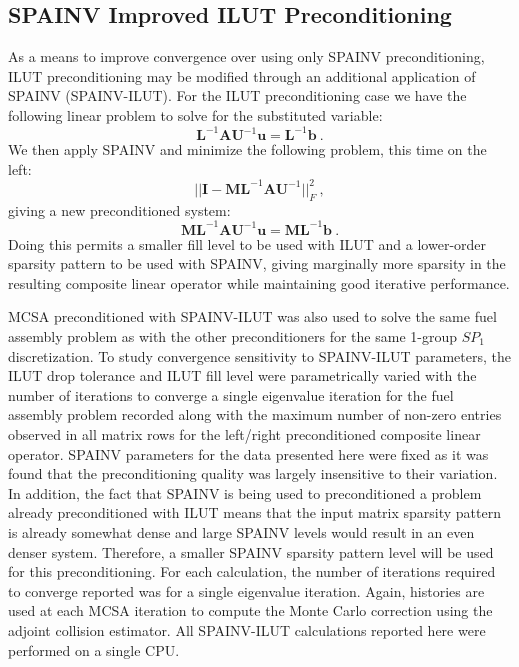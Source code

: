 \subsection{SPAINV Improved ILUT Preconditioning}
\label{subsec:spn_spainv_preconditioning}
As a means to improve convergence over using only SPAINV
preconditioning, ILUT preconditioning may be modified through an
additional application of SPAINV
(SPAINV-ILUT)\cite{saad_iterative_2003}. For the ILUT preconditioning
case we have the following linear problem to solve for the substituted
variable:
\begin{equation}
  \mathbf{L}^{-1} \mathbf{A} \mathbf{U}^{-1} \mathbf{u} =
  \mathbf{L}^{-1} \mathbf{b}\:.
  \label{eq:ilut_standalone}
\end{equation}
We then apply SPAINV and minimize the following problem, this time on
the left:
\begin{equation}
  || \mathbf{I} - \mathbf{M} \mathbf{L}^{-1} \mathbf{A}
  \mathbf{U}^{-1} ||^2_F\:,
  \label{eq:ilut_minimize}
\end{equation}
giving a new preconditioned system:
\begin{equation}
  \mathbf{M} \mathbf{L}^{-1} \mathbf{A} \mathbf{U}^{-1} \mathbf{u} =
  \mathbf{M} \mathbf{L}^{-1} \mathbf{b}\:.
  \label{eq:ilut_spainv}
\end{equation}
Doing this permits a smaller fill level to be used with ILUT and a
lower-order sparsity pattern to be used with SPAINV, giving marginally
more sparsity in the resulting composite linear operator while
maintaining good iterative performance.

MCSA preconditioned with SPAINV-ILUT was also used to solve the same
fuel assembly problem as with the other preconditioners for the same
1-group $SP_1$ discretization. To study convergence sensitivity to
SPAINV-ILUT parameters, the ILUT drop tolerance and ILUT fill level
were parametrically varied with the number of iterations to converge a
single eigenvalue iteration for the fuel assembly problem recorded
along with the maximum number of non-zero entries observed in all
matrix rows for the left/right preconditioned composite linear
operator. SPAINV parameters for the data presented here were fixed as
it was found that the preconditioning quality was largely insensitive
to their variation. In addition, the fact that SPAINV is being used to
preconditioned a problem already preconditioned with ILUT means that
the input matrix sparsity pattern is already somewhat dense and large
SPAINV levels would result in an even denser system. Therefore, a
smaller SPAINV sparsity pattern level will be used for this
preconditioning. For each calculation, the number of iterations
required to converge reported was for a single eigenvalue iteration.
Again,  histories are used at each MCSA iteration to compute
the Monte Carlo correction using the adjoint collision estimator. All
SPAINV-ILUT calculations reported here were performed on a single CPU.

